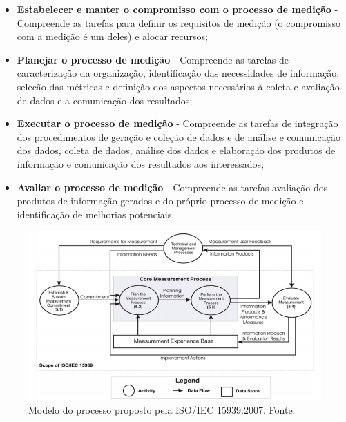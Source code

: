       \begin{itemize}
	
	\item \textbf{Estabelecer e manter o compromisso com o processo de medição} - Compreende as tarefas para definir os requisitos
	      de medição (o compromisso com a medição é um deles) e alocar recursos;
	      
	\item \textbf{Planejar o processo de medição} - Compreende as tarefas de caracterização da organização, identificação das 
	      necessidades de informação, selecão das métricas e definição dos aspectos necessários à coleta e avaliação de dados e 
	      a comunicação dos resultados;
	      
	\item \textbf{Executar o processo de medição} - Compreende as tarefas de integração dos procedimentos de geração e coleção
	      de dados e de análise e comunicação dos dados, coleta de dados, análise dos dados e elaboração dos produtos de
	      informação e comunicação dos resultados aos interessados;
	
	\item \textbf{Avaliar o processo de medição} - Compreende as tarefas avaliação dos produtos de informação gerados e do
	      próprio processo de medição e identificação de melhorias potenciais.
	
      \end{itemize}

      \begin{figure}[!htb]
	\centering
	\includegraphics[scale=0.55]{figuras/iso15939}
	\caption[Modelo do processo proposto pela ISO/IEC 15939:2007.]
		{Modelo do processo proposto pela ISO/IEC 15939:2007. Fonte: \cite{iso15939}}
	\label{iso15939_model}
      \end{figure}
      
